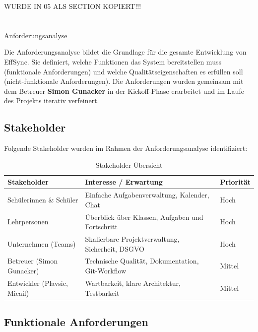 WURDE IN 05 ALS SECTION KOPIERT!!!
\section{}{Anforderungsanalyse}
\label{ch:anforderungsanalyse}

Die Anforderungsanalyse bildet die Grundlage für die gesamte Entwicklung
von EffSync. Sie definiert, welche Funktionen das System bereitstellen
muss (funktionale Anforderungen) und welche Qualitätseigenschaften es
erfüllen soll (nicht-funktionale Anforderungen). Die Anforderungen wurden
gemeinsam mit dem Betreuer \textbf{Simon Gunacker} in der Kickoff-Phase
erarbeitet und im Laufe des Projekts iterativ verfeinert.

\subsection{Stakeholder}

Folgende Stakeholder wurden im Rahmen der Anforderungsanalyse identifiziert:

\begin{table}[H]
    \centering
    \caption{Stakeholder-Übersicht}
    \begin{tabularx}{\textwidth}{lXl}
        \toprule
        \textbf{Stakeholder} & \textbf{Interesse / Erwartung}
          & \textbf{Priorität} \\
        \midrule
        Schülerinnen \& Schüler
          & Einfache Aufgabenverwaltung, Kalender, Chat
          & Hoch \\
        Lehrpersonen
          & Überblick über Klassen, Aufgaben und Fortschritt
          & Hoch \\
        Unternehmen (Teams)
          & Skalierbare Projektverwaltung, Sicherheit, DSGVO
          & Hoch \\
        Betreuer (Simon Gunacker)
          & Technische Qualität, Dokumentation, Git-Workflow
          & Mittel \\
        Entwickler (Plavsic, Micail)
          & Wartbarkeit, klare Architektur, Testbarkeit
          & Mittel \\
        \bottomrule
    \end{tabularx}
    \label{tab:stakeholder}
\end{table}

\subsection{Funktionale Anforderungen}
\label{sec:funktionale-anforderungen}

